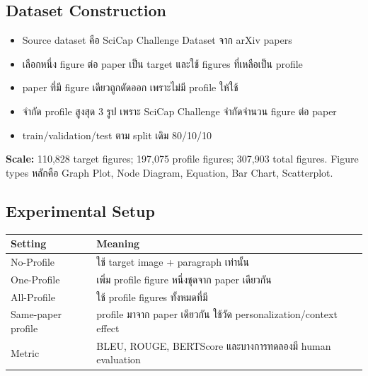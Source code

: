 \documentclass[10pt,a4paper]{article}
\begin{document}
\subsection{Dataset Construction}
\begin{itemize}
\item Source dataset คือ SciCap Challenge Dataset จาก arXiv papers
\item เลือกหนึ่ง figure ต่อ paper เป็น target และใช้ figures ที่เหลือเป็น profile
\item paper ที่มี figure เดียวถูกตัดออก เพราะไม่มี profile ให้ใช้
\item จำกัด profile สูงสุด 3 รูป เพราะ SciCap Challenge จำกัดจำนวน figure ต่อ paper
\item train/validation/test ตาม split เดิม 80/10/10
\end{itemize}

\begin{note}
\textbf{Scale:} 110,828 target figures; 197,075 profile figures; 307,903 total figures. Figure types หลักคือ Graph Plot, Node Diagram, Equation, Bar Chart, Scatterplot.
\end{note}

\subsection{Experimental Setup}
\begin{longtable}{@{}L{3.2cm}L{11.4cm}@{}}
\toprule
\textbf{Setting} & \textbf{Meaning} \\
\midrule
No-Profile & ใช้ target image + paragraph เท่านั้น \\
One-Profile & เพิ่ม profile figure หนึ่งชุดจาก paper เดียวกัน \\
All-Profile & ใช้ profile figures ทั้งหมดที่มี \\
Same-paper profile & profile มาจาก paper เดียวกัน ใช้วัด personalization/context effect \\
Metric & BLEU, ROUGE, BERTScore และบางการทดลองมี human evaluation \\
\bottomrule
\end{longtable}
\end{document}

